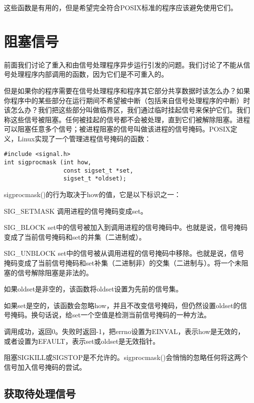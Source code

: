 这些函数是有用的，但是希望完全符合POSIX标准的程序应该避免使用它们。

\section{阻塞信号}

前面我们讨论了重入和由信号处理程序异步运行引发的问题。我们讨论了不能从信号处理程序内部调用的函数，因为它们是不可重入的。

但是如果你的程序需要在信号处理程序和程序其它部分共享数据时该怎么办？如果你程序中的某些部分在运行期间不希望被中断（包括来自信号处理程序的中断）时该怎么办？我们把这些部分叫做临界区，我们通过临时挂起信号来保护它们。我们称这些信号被阻塞。任何被挂起的信号都不会被处理，直到它们被解除阻塞。进程可以阻塞任意多个信号；被进程阻塞的信号叫做该进程的信号掩码。POSIX定义，Linux实现了一个管理进程信号掩码的函数：

\begin{lstlisting}
#include <signal.h>
int sigprocmask (int how,
                 const sigset_t *set,
                 sigset_t *oldset);
\end{lstlisting}

sigprocmask()的行为取决于how的值，它是以下标识之一：

\begin{eqlist*}
\item[SIG\_SETMASK] 调用进程的信号掩码变成set。
\item[SIG\_BLOCK] set中的信号被加入到调用进程的信号掩码中。也就是说，信号掩码变成了当前信号掩码和set的并集（二进制或）。
\item[SIG\_UNBLOCK] set中的信号被从调用进程的信号掩码中移除。也就是说，信号掩码变成了当前信号掩码和set补集（二进制非）的交集（二进制与）。将一个未阻塞的信号解除阻塞是非法的。
\end{eqlist*}

如果oldset是非空的，该函数将oldset设置为先前的信号集。

如果set是空的，该函数会忽略how，并且不改变信号掩码，但仍然设置oldset的信号掩码。换句话说，给set一个空值是检测当前信号掩码的一种方法。

 调用成功，返回0。失败时返回-1，把errno设置为EINVAL，表示how是无效的，或者设置为EFAULT，表示set或oldset是无效指针。

阻塞SIGKILL或SIGSTOP是不允许的。sigprocmask()会悄悄的忽略任何将这两个信号加入信号掩码的尝试。

\subsection{获取待处理信号}

